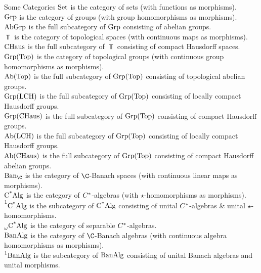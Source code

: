 \documentclass[preamble.tex]{subfiles}
\begin{document}
\vspace{1pt}

\begin{filingbox}{\large Some Categories}{}
$\operatorname{Set}$ is the category of sets (with functions as morphisms).\\ 
$\operatorname{Grp}$ is the category of groups (with group homomorphisms as morphisms).\\ 
$\operatorname{AbGrp}$ is the full subcategory of $\operatorname{Grp}$ consisting of abelian groups.\\
$\Top$ is the category of topological spaces (with continuous maps as morphisms).\\ 
$\operatorname{CHaus}$ is the full subcategory of $\Top$ consisting of compact Hausdorff spaces.\\ 
$\operatorname{Grp(Top)}$ is the category of topological groups (with continuous group homomorphisms as morphisms).\\ 
$\operatorname{Ab(Top)}$ is the full subcategory of $\operatorname{Grp(Top)}$ consisting of topological abelian groups.\\
$\operatorname{Grp(LCH)}$ is the full subcategory of $\operatorname{Grp(Top)}$ consisting of locally compact Hausdorff groups.\\
$\operatorname{Grp(CHaus)}$ is the full subcategory of $\operatorname{Grp(Top)}$ consisting of compact Hausdorff groups.\\ 
$\operatorname{Ab(LCH)}$ is the full subcategory of $\operatorname{Grp(Top)}$ consisting of locally compact Hausdorff groups.\\ 
$\operatorname{Ab(CHaus)}$ is the full subcategory of $\operatorname{Grp(Top)}$ consisting of compact Hausdorff abelian groups.\\
$\BanSpace{\C}$ is the category of $\C$-Banach spaces (with continuous linear maps as morphisms).\\
$\operatorname{C^{*}Alg}$ is the category of ${C}^{*}$-algebras (with $\star$-homomorphisms as morphisms).\\
$\operatorname{\prescript{1}{}{C^{*}Alg}}$ is the subcategory of $\operatorname{C^{*}Alg}$ consisting of unital ${C}^{*}$-algebras \& unital $\star$-homomorphisms.\\
$\operatorname{\prescript{}{\omega}{C^{*}Alg}}$ is the category of separable ${C}^{*}$-algebras.\\
$\operatorname{BanAlg}$ is the category of $\C$-Banach algebras (with continuous algebra homomorphisms as morphisms).\\
$\operatorname{\prescript{1}{}{BanAlg}}$ is the subcategory of $\operatorname{BanAlg}$ consisting of unital Banach algebras and unital morphisms.
\end{filingbox}

\vspace{1pt}
\end{document}
